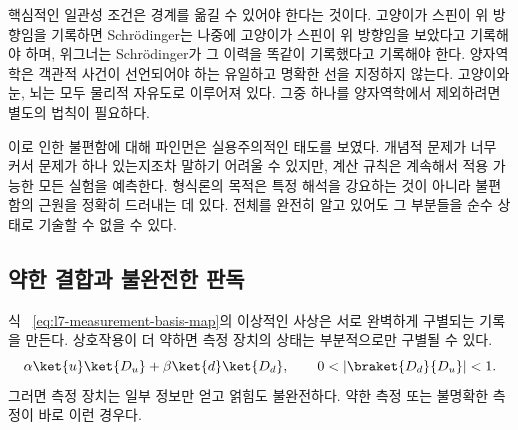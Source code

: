 핵심적인 일관성 조건은 경계를 옮길 수 있어야 한다는 것이다. 고양이가 스핀이 위 방향임을 기록하면 Schr\"odinger는 나중에 고양이가 스핀이 위 방향임을 보았다고 기록해야 하며, 위그너는 Schr\"odinger가 그 이력을 똑같이 기록했다고 기록해야 한다. 양자역학은 객관적 사건이 선언되어야 하는 유일하고 명확한 선을 지정하지 않는다. 고양이와 눈, 뇌는 모두 물리적 자유도로 이루어져 있다. 그중 하나를 양자역학에서 제외하려면 별도의 법칙이 필요하다.

이로 인한 불편함에 대해 파인먼은 실용주의적인 태도를 보였다. 개념적 문제가 너무 커서 문제가 하나 있는지조차 말하기 어려울 수 있지만, 계산 규칙은 계속해서 적용 가능한 모든 실험을 예측한다. 형식론의 목적은 특정 해석을 강요하는 것이 아니라 불편함의 근원을 정확히 드러내는 데 있다. 전체를 완전히 알고 있어도 그 부분들을 순수 상태로 기술할 수 없을 수 있다.

\begin{classroomqa}
\end{classroomqa}

\begin{classroomqa}
\end{classroomqa}

\subsection{약한 결합과 불완전한 판독}

식 ~\eqref{eq:l7-measurement-basis-map}의 이상적인 사상은 서로 완벽하게 구별되는 기록을 만든다. 상호작용이 더 약하면 측정 장치의 상태는 부분적으로만 구별될 수 있다.
\begin{equation}
\alpha\ket{u}\ket{D_u}
+\beta\ket{d}\ket{D_d},
\qquad
0<|\braket{D_d}{D_u}|<1.
\label{eq:l7-weak-measurement}
\end{equation}
그러면 측정 장치는 일부 정보만 얻고 얽힘도 불완전하다. 약한 측정 또는 불명확한 측정이 바로 이런 경우다.

